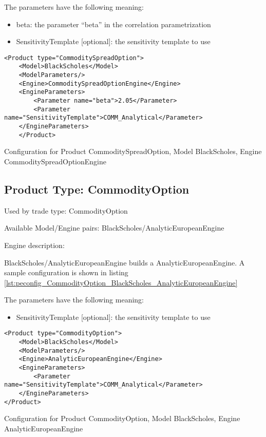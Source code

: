 The parameters have the following meaning:

\begin{itemize}
\item beta: the parameter ``beta'' in the correlation parametrization
\item SensitivityTemplate [optional]: the sensitivity template to use 
\end{itemize}

\begin{longlisting}
\begin{verbatim}
<Product type="CommoditySpreadOption">
    <Model>BlackScholes</Model>
    <ModelParameters/>
    <Engine>CommoditySpreadOptionEngine</Engine>
    <EngineParameters>
        <Parameter name="beta">2.05</Parameter>
        <Parameter name="SensitivityTemplate">COMM_Analytical</Parameter>
    </EngineParameters>
    </Product>
\end{verbatim}
\caption{Configuration for Product CommoditySpreadOption, Model BlackScholes, Engine CommoditySpreadOptionEngine}
\label{lst:peconfig_CommoditySpreadOption_BlackScholes_CommoditySpreadOptionEngine}
\end{longlisting}

\subsection{Product Type: CommodityOption}

Used by trade type: CommodityOption

Available Model/Engine pairs: BlackScholes/AnalyticEuropeanEngine

Engine description:

BlackScholes/AnalyticEuropeanEngine builds a AnalyticEuropeanEngine. A sample configuration is shown in listing
\ref{lst:peconfig_CommodityOption_BlackScholes_AnalyticEuropeanEngine}

The parameters have the following meaning:

\begin{itemize}
\item SensitivityTemplate [optional]: the sensitivity template to use 
\end{itemize}

\begin{longlisting}
\begin{verbatim}
<Product type="CommodityOption">
    <Model>BlackScholes</Model>
    <ModelParameters/>
    <Engine>AnalyticEuropeanEngine</Engine>
    <EngineParameters>
        <Parameter name="SensitivityTemplate">COMM_Analytical</Parameter>
    </EngineParameters>
</Product>
\end{verbatim}
\caption{Configuration for Product CommodityOption, Model BlackScholes, Engine AnalyticEuropeanEngine}
\label{lst:peconfig_CommodityOption_BlackScholes_AnalyticEuropeanEngine}
\end{longlisting}

